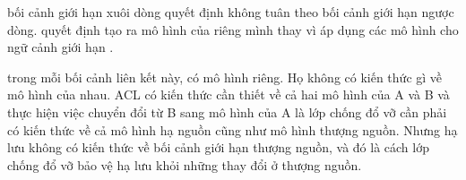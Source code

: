 

bối cảnh giới hạn xuôi dòng quyết định không tuân theo bối cảnh giới hạn ngược dòng.
quyết định tạo ra mô hình của riêng mình thay vì áp dụng các mô hình cho ngữ cảnh giới hạn .




trong mỗi bối cảnh liên kết này, có mô hình riêng. Họ không có kiến thức gì về mô hình của nhau.
ACL có kiến thức cần thiết về cả hai mô hình của A và B và thực hiện việc chuyển đổi từ B sang mô hình của A là lớp chống đổ vỡ cần phải có kiến thức về cả mô hình hạ nguồn cũng như mô hình thượng nguồn.
Nhưng hạ lưu không có kiến thức về bối cảnh giới hạn thượng nguồn, và đó là cách lớp chống đổ vỡ bảo vệ hạ lưu khỏi những thay đổi ở thượng nguồn.








